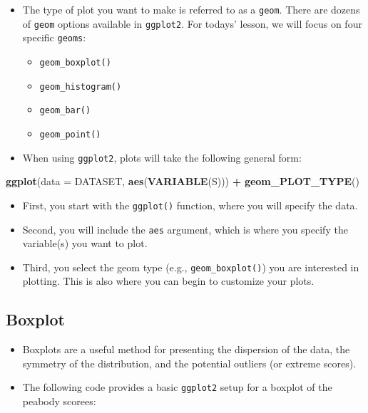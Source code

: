 \documentclass[
]{book}
\newenvironment{Shaded}{\begin{snugshade}}{\end{snugshade}}
\newcommand{\AttributeTok}[1]{\textcolor[rgb]{0.13,0.29,0.53}{#1}}
\newcommand{\FunctionTok}[1]{\textcolor[rgb]{0.13,0.29,0.53}{\textbf{#1}}}
\newcommand{\NormalTok}[1]{#1}
\newcommand{\SpecialCharTok}[1]{\textcolor[rgb]{0.81,0.36,0.00}{\textbf{#1}}}
\providecommand{\tightlist}{%
  \setlength{\itemsep}{0pt}\setlength{\parskip}{0pt}}
\begin{document}
\begin{itemize}
\tightlist
\item
  The type of plot you want to make is referred to as a \texttt{geom}. There are dozens of \texttt{geom} options available in \texttt{ggplot2}. For todays' lesson, we will focus on four specific \texttt{geoms}:

  \begin{itemize}
  \tightlist
  \item
    \texttt{geom\_boxplot()}
  \item
    \texttt{geom\_histogram()}
  \item
    \texttt{geom\_bar()}
  \item
    \texttt{geom\_point()}
  \end{itemize}
\item
  When using \texttt{ggplot2}, plots will take the following general form:
\end{itemize}

\begin{Shaded}
\begin{Highlighting}[]
\FunctionTok{ggplot}\NormalTok{(}\AttributeTok{data =}\NormalTok{ DATASET, }\FunctionTok{aes}\NormalTok{(}\FunctionTok{VARIABLE}\NormalTok{(S))) }\SpecialCharTok{+}
  \FunctionTok{geom\_PLOT\_TYPE}\NormalTok{()}
\end{Highlighting}
\end{Shaded}

\begin{itemize}
\item
  First, you start with the \texttt{ggplot()} function, where you will specify the data.
\item
  Second, you will include the \texttt{aes} argument, which is where you specify the variable(s) you want to plot.
\item
  Third, you select the geom type (e.g., \texttt{geom\_boxplot()}) you are interested in plotting. This is also where you can begin to customize your plots.
\end{itemize}

\subsection{Boxplot}\label{boxplot}

\begin{itemize}
\item
  Boxplots are a useful method for presenting the dispersion of the data, the symmetry of the distribution, and the potential outliers (or extreme scores).
\item
  The following code provides a basic \texttt{ggplot2} setup for a boxplot of the peabody scorees:
\end{itemize}
\end{document}
